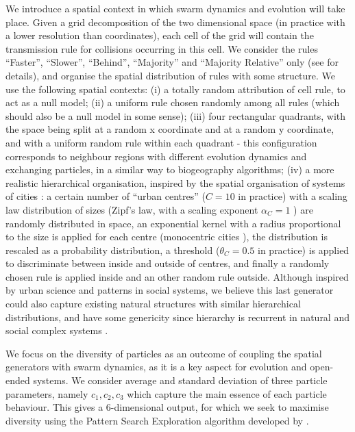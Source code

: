 \documentclass[letterpaper]{article}
\begin{document}
We introduce a spatial context in which swarm dynamics and evolution will take place. Given a grid decomposition of the two dimensional space (in practice with a lower resolution than coordinates), each cell of the grid will contain the transmission rule for collisions occurring in this cell. We consider the rules ``Faster'', ``Slower'', ``Behind'', ``Majority'' and ``Majority Relative'' only (see \citep{sayama2018seeking} for details), and organise the spatial distribution of rules with some structure. We use the following spatial contexts: (i) a totally random attribution of cell rule, to act as a null model; (ii) a uniform rule chosen randomly among all rules (which should also be a null model in some sense); (iii) four rectangular quadrants, with the space being split at a random x coordinate and at a random y coordinate, and with a uniform random rule within each quadrant - this configuration corresponds to neighbour regions with different evolution dynamics and exchanging particles, in a similar way to biogeography algorithms; (iv) a more realistic hierarchical organisation, inspired by the spatial organisation of systems of cities \citep{batty2008size}: a certain number of ``urban centres'' ($C=10$ in practice) with a scaling law distribution of sizes (Zipf's law, with a scaling exponent $\alpha_C = 1$ \citep{pumain2006evolutionary}) are randomly distributed in space, an exponential kernel with a radius proportional to the size is applied for each centre (monocentric cities \citep{lemoy2020evidence}), the distribution is rescaled as a probability distribution, a threshold ($\theta_C = 0.5$ in practice) is applied to discriminate between inside and outside of centres, and finally a randomly chosen rule is applied inside and an other random rule outside. Although inspired by urban science and patterns in social systems, we believe this last generator could also capture existing natural structures with similar hierarchical distributions, and have some genericity since hierarchy is recurrent in natural and social complex systems \citep{pumain2006hierarchy}.

We focus on the diversity of particles as an outcome of coupling the spatial generators with swarm dynamics, as it is a key aspect for evolution and open-ended systems. We consider average and standard deviation of three particle parameters, namely $c_1, c_2, c_3$ which capture the main essence of each particle behaviour. This gives a 6-dimensional output, for which we seek to maximise diversity using the Pattern Search Exploration algorithm developed by \citep{cherel2015beyond}.
\end{document}
